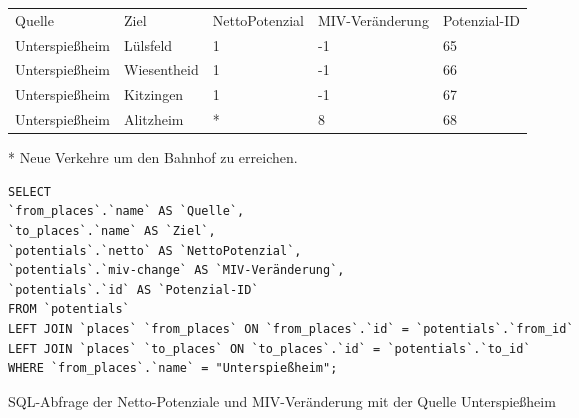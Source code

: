 \begin{tabular}{ l  l  l  l  l }
Quelle & Ziel & NettoPotenzial & MIV-Veränderung & Potenzial-ID\\ 
Unterspießheim & Lülsfeld & 1 & -1 & 65\\ 
Unterspießheim & Wiesentheid & 1 & -1 & 66\\ 
Unterspießheim & Kitzingen & 1 & -1 & 67\\ 
Unterspießheim & Alitzheim & * & 8 & 68\\ 
\end{tabular}    
\newline
\newline
* Neue Verkehre um den Bahnhof zu erreichen.
\newline
\begin{listing}[htbp]
\begin{verbatim}
SELECT
`from_places`.`name` AS `Quelle`, 
`to_places`.`name` AS `Ziel`, 
`potentials`.`netto` AS `NettoPotenzial`, 
`potentials`.`miv-change` AS `MIV-Veränderung`, 
`potentials`.`id` AS `Potenzial-ID`
FROM `potentials`
LEFT JOIN `places` `from_places` ON `from_places`.`id` = `potentials`.`from_id`
LEFT JOIN `places` `to_places` ON `to_places`.`id` = `potentials`.`to_id`
WHERE `from_places`.`name` = "Unterspießheim";
\end{verbatim}
\caption{SQL-Abfrage der Netto-Potenziale und MIV-Veränderung mit der Quelle Unterspießheim}\label{lst-fz-unterspiessheim}
\end{listing}